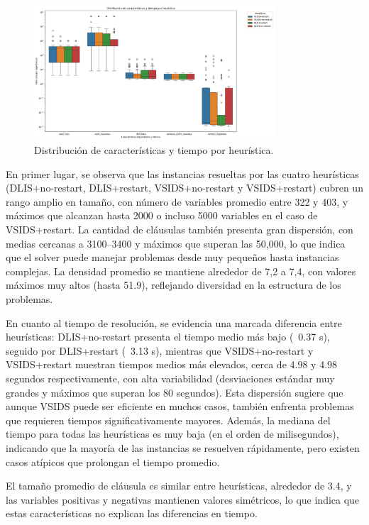 \begin{figure}[ht]
    \centering
    \includegraphics[width=0.8\textwidth]{Graphics/caracteristica_tiempo_x_heuristica.png}
    \caption{Distribuci\'on de caracter\'isticas y tiempo por heur\'istica.}
    \label{fig:caract-tiempo-x-heuristica}
\end{figure}


En primer lugar, se observa que las instancias resueltas por las cuatro heurísticas (DLIS+no-restart, DLIS+restart, VSIDS+no-restart y VSIDS+restart) cubren un rango amplio en tamaño, con número de variables promedio entre 322 y 403, y máximos que alcanzan hasta 2000 o incluso 5000 variables en el caso de VSIDS+restart. La cantidad de cláusulas también presenta gran dispersión, con medias cercanas a 3100–3400 y máximos que superan las 50,000, lo que indica que el solver puede manejar problemas desde muy pequeños hasta instancias complejas. La densidad promedio se mantiene alrededor de 7,2 a 7,4, con valores máximos muy altos (hasta 51.9), reflejando diversidad en la estructura de los problemas.

En cuanto al tiempo de resolución, se evidencia una marcada diferencia entre heurísticas: DLIS+no-restart presenta el tiempo medio más bajo (~0.37 s), seguido por DLIS+restart (~3.13 s), mientras que VSIDS+no-restart y VSIDS+restart muestran tiempos medios más elevados, cerca de 4.98 y 4.98 segundos respectivamente, con alta variabilidad (desviaciones estándar muy grandes y máximos que superan los 80 segundos). Esta dispersión sugiere que aunque VSIDS puede ser eficiente en muchos casos, también enfrenta problemas que requieren tiempos significativamente mayores. Además, la mediana del tiempo para todas las heurísticas es muy baja (en el orden de milisegundos), indicando que la mayoría de las instancias se resuelven rápidamente, pero existen casos atípicos que prolongan el tiempo promedio.

El tamaño promedio de cláusula es similar entre heurísticas, alrededor de 3.4, y las variables positivas y negativas mantienen valores simétricos, lo que indica que estas características no explican las diferencias en tiempo.

